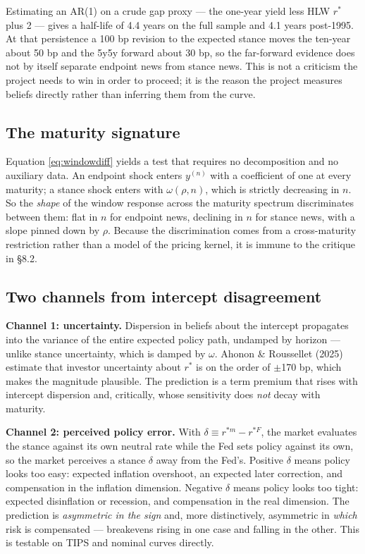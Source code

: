 \documentclass[11pt]{article}
\newcommand{\rs}{$r^{*}$}
\begin{document}
\noindent Estimating an AR(1) on a crude gap proxy --- the one-year yield less HLW \rs{} plus 2
--- gives a half-life of 4.4 years on the full sample and 4.1 years post-1995. At that
persistence a 100 bp revision to the expected stance moves the ten-year about 50 bp and the
5y5y forward about 30 bp, so the far-forward evidence does not by itself separate endpoint
news from stance news. This is not a criticism the project needs to win in order to proceed;
it is the reason the project measures beliefs directly rather than inferring them from the
curve.

\subsection{The maturity signature}

Equation \eqref{eq:windowdiff} yields a test that requires no decomposition and no auxiliary
data. An endpoint shock enters $y^{(n)}$ with a coefficient of one at every maturity; a stance
shock enters with $\omega(\rho,n)$, which is strictly decreasing in $n$. So the \emph{shape} of
the window response across the maturity spectrum discriminates between them: flat in $n$ for
endpoint news, declining in $n$ for stance news, with a slope pinned down by $\rho$. Because
the discrimination comes from a cross-maturity restriction rather than a model of the pricing
kernel, it is immune to the critique in \S8.2.

\subsection{Two channels from intercept disagreement}

\textbf{Channel 1: uncertainty.} Dispersion in beliefs about the intercept propagates into the
variance of the entire expected policy path, undamped by horizon --- unlike stance
uncertainty, which is damped by $\omega$. Ahonon \& Roussellet (2025) estimate that investor
uncertainty about \rs{} is on the order of $\pm$170 bp, which makes the magnitude plausible.
The prediction is a term premium that rises with intercept dispersion and, critically, whose
sensitivity does \emph{not} decay with maturity.

\textbf{Channel 2: perceived policy error.} With $\delta \equiv r^{*m} - r^{*F}$, the market
evaluates the stance against its own neutral rate while the Fed sets policy against its own,
so the market perceives a stance $\delta$ away from the Fed's. Positive $\delta$ means policy
looks too easy: expected inflation overshoot, an expected later correction, and compensation
in the inflation dimension. Negative $\delta$ means policy looks too tight: expected
disinflation or recession, and compensation in the real dimension. The prediction is
\emph{asymmetric in the sign} and, more distinctively, asymmetric in \emph{which} risk is
compensated --- breakevens rising in one case and falling in the other. This is testable on
TIPS and nominal curves directly.
\end{document}
